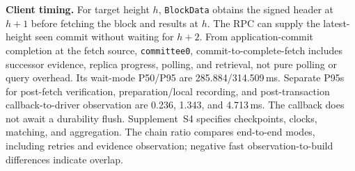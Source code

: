 \noindent\textbf{Client timing.}
For target height $h$, \texttt{BlockData} obtains the signed header
at $h+1$ before fetching the block and results at $h$. The RPC can
supply the latest-height seen commit without waiting for $h+2$.
From application-commit completion at the fetch source,
\texttt{committee0}, commit-to-complete-fetch includes successor
evidence, replica progress, polling, and retrieval, not pure polling
or query overhead. Its wait-mode P50/P95 are 285.884/314.509\,ms.
Separate P95s for post-fetch verification, preparation/local recording,
and post-transaction callback-to-driver observation are 0.236, 1.343,
and 4.713\,ms. The callback does not await a durability flush.
Supplement~S4 specifies checkpoints, clocks, matching, and aggregation.
The chain ratio compares end-to-end modes, including retries and
evidence observation; negative fast observation-to-build differences
indicate overlap.